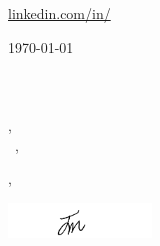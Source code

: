 \documentclass[12pt]{letter}
\begin{document}
\AddToShipoutPictureBG{%
\color{gr}
\AtPageUpperLeft{\rule[-1.3in]{\paperwidth}{1.3in}}
}

\begin{center}
{\fontsize{28}{0}\selectfont\scshape \myname}

\href{mailto:\myemail}{\faEnvelope\enspace \myemail}\hfill
\href{https://linkedin.com/in/\mylinkedin}{\faLinkedinIn\enspace linkedin.com/in/\mylinkedin}\hfill
\href{tel:\myphone}{\faPhone\enspace \myphone}\hfill
\faMapMarker\enspace \mylocation
\end{center}

\vspace{0.2in}

\today\\

\vspace{-0.1in}\recipient\\
\company\\
\street\\
\city, \state\ \zip\\

\vspace{-0.1in}\greeting\ \recipient,\\

\vspace{-0.1in}\setlength\parindent{24pt}
\noindent

\vspace{0.1in}
\vfill

\begin{flushright}
\closer,

\vspace{-0.1in}\includegraphics[width=1.5in]{sig.png}\vspace{-0.1in}

\myname\\
\mytitle
\end{flushright}
\end{document}
